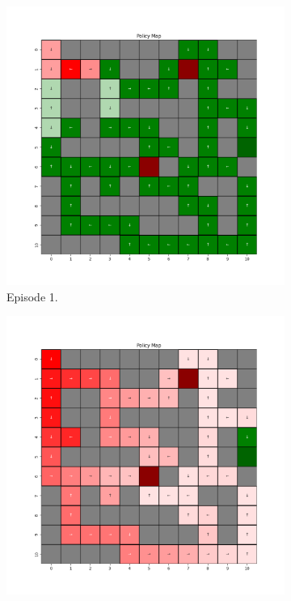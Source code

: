 \documentclass{assignment}
\begin{document}
\begin{figure}[H]
    \begin{subfigure}{0.3\textwidth}
        \includegraphics[width=\textwidth]{figures/policy_q/epsilon_sweep/policy_alpha_0.1_gamma_0.95_epsilon_1.0_iteration_1.png}
    \caption{Episode 1.}
    \end{subfigure}\hfill
    \begin{subfigure}{0.3\textwidth}
        \includegraphics[width=\textwidth]{figures/policy_q/epsilon_sweep/policy_alpha_0.1_gamma_0.95_epsilon_1.0_iteration_50.png}

\end{subfigure}
\end{figure}
\end{document}
